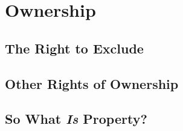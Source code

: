 \chapter{Ownership}



\section{The Right to Exclude}



\begin{questions}



\end{questions}





\begin{questions}

\end{questions}







\section{Other Rights of Ownership}



\begin{questions}

\end{questions}





\section{So What \textit{Is} Property?}













\begin{questions}

\end{questions}
